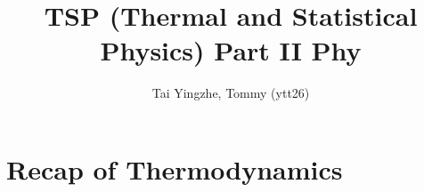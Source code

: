 \documentclass[a4paper]{article}
\title{\textbf{TSP (Thermal and Statistical Physics) Part II Phy}}
\author{Tai Yingzhe, Tommy (ytt26)}
\date{}
\theoremstyle{new}
\begin{document}
\maketitle
{\small\tableofcontents}

\newpage
\section{Recap of Thermodynamics}
\end{document}
